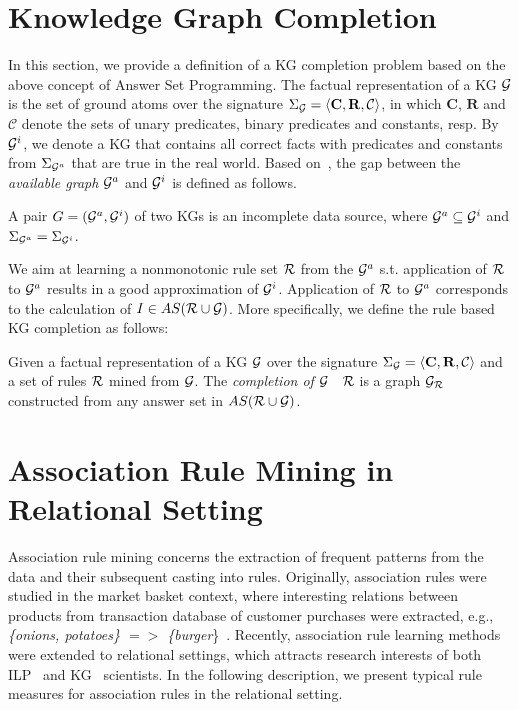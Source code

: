 \section{Knowledge Graph Completion}

In this section, we provide a definition of a KG completion problem based on the above concept of Answer Set Programming. The factual representation of a KG $\mathcal{G}$ is the set of ground atoms over the signature $\Sigma_{\mathcal{G}}=\langle\mathbf{C},\mathbf{R},\mathcal{C}\rangle$, in which $\mathbf{C}$, $\mathbf{R}$ and $\mathcal{C}$ denote the sets of unary predicates, binary predicates and constants, resp. By $\mathcal{G}^i$, we denote a KG that contains all correct facts with predicates and constants from $\Sigma_{\mathcal{G}^a}$ that are true in the real world. Based on~\cite{ref51}, the gap between the \emph{available graph} $\mathcal{G}^a$ and $\mathcal{G}^i$ is defined as follows.

\begin{definition} A pair $G = (\mathcal{G}^a, \mathcal{G}^i)$ of two KGs is an incomplete data source, where $\mathcal{G}^a\subseteq \mathcal{G}^i$ and $\Sigma_{\mathcal{G}^a}=\Sigma_{\mathcal{G}^i}$.
\end{definition}

We aim at learning a nonmonotonic rule set $\mathcal{R}$ from the $\mathcal{G}^a$ s.t. application of $\mathcal{R}$ to $\mathcal{G}^a$ results in a good approximation of $\mathcal{G}^i$. Application of $\mathcal{R}$ to $\mathcal{G}^a$ corresponds to the calculation of $I \in AS(\mathcal{R} \cup \mathcal{G})$. More specifically, we define the rule based KG completion as follows:

\begin{definition}\label{def:graphcompl}
Given a factual representation of a KG $\mathcal{G}$ over the signature $\Sigma_{\mathcal{G}}=\langle\mathbf{C},\mathbf{R},\mathcal{C}\rangle$ and a set of rules $\mathcal{R}$ mined from $\mathcal{G}$. The \emph{completion of $\mathcal{G}$ \wrt\ $\mathcal{R}$} is a graph $\mathcal{G}_{\mathcal{R}}$ constructed from any answer set in $AS(\mathcal{R} \cup \mathcal{G})$.
\end{definition}

\section{Association Rule Mining in Relational Setting}

Association rule mining concerns the extraction of frequent patterns from the data and their subsequent casting into rules. Originally, association rules were studied in the market basket context, where interesting relations between products from transaction database of customer purchases were extracted, e.g., \textit{\{onions, potatoes\} $=>$ \{burger}\}~\cite{ref54}. Recently, association rule learning methods were extended to relational settings, which attracts research interests of both ILP~\cite{ref52} and KG~\cite{ref10} scientists. In the following description, we present typical rule measures for association rules in the relational setting.

